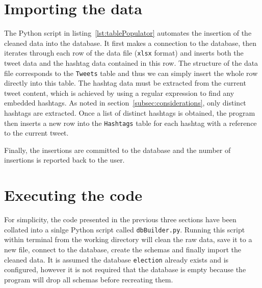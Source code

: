\documentclass[a4paper, 12pt]{report}
\begin{document}

\label{lst:dataCleaner}

\section{Importing the data}
\label{sec:dataImporting}

The Python script in listing~\ref{lst:tablePopulator} automates the insertion of the cleaned data into the database. It first makes a connection to the database, then iterates through each row of the data file (\texttt{xlsx} format) and inserts both the tweet data and the hashtag data contained in this row. The structure of the data file corresponds to the \texttt{Tweets} table and thus we can simply insert the whole row directly into this table. The hashtag data must be extracted from the current tweet content, which is achieved by using a regular expression to find any embedded hashtags. As noted in section~\ref{subsec:considerations}, only distinct hashtags are extracted. Once a list of distinct hashtags is obtained, the program then inserts a new row into the \texttt{Hashtags} table for each hashtag with a reference to the current tweet.

Finally, the insertions are committed to the database and the number of insertions is reported back to the user.


\label{lst:tablePopulator}

\section{Executing the code}

For simplicity, the code presented in the previous three sections have been collated into a sinlge Python script called \texttt{dbBuilder.py}. Running this script within terminal from the working directory will clean the raw data, save it to a new file, connect to the database, create the schemas and finally import the cleaned data. It is assumed the database \texttt{election} already exists and is configured, however it is not required that the database is empty because the program will drop all schemas before recreating them.
\end{document}
